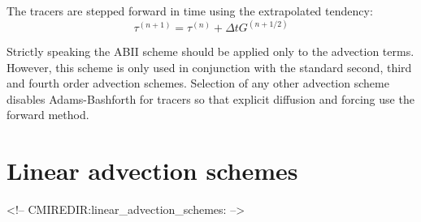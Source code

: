 The tracers are stepped forward in time using the extrapolated tendency:
\begin{equation}
\tau^{(n+1)} = \tau^{(n)} + \Delta t G^{(n+1/2)}
\end{equation}


Strictly speaking the ABII scheme should be applied only to the
advection terms. However, this scheme is only used in conjunction with
the standard second, third and fourth order advection
schemes. Selection of any other advection scheme disables
Adams-Bashforth for tracers so that explicit diffusion and forcing use
the forward method.




\section{Linear advection schemes}
\label{sec:tracer-advection}
\begin{rawhtml}
<!-- CMIREDIR:linear_advection_schemes: -->
\end{rawhtml}

